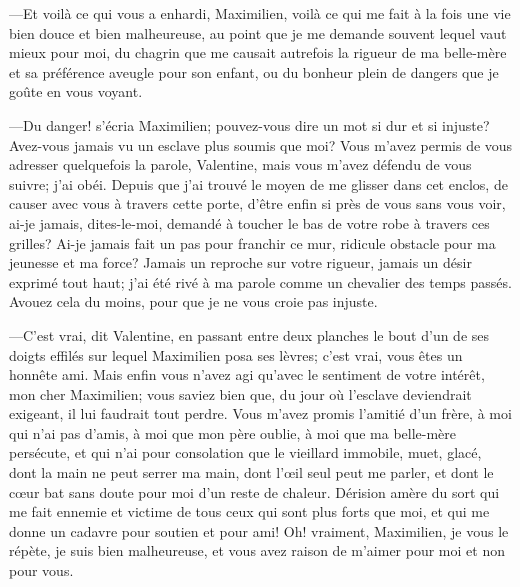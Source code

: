—Et voilà ce qui vous a enhardi, Maximilien, voilà ce qui me fait à la fois une vie bien douce et bien malheureuse, au point que je me demande souvent lequel vaut mieux pour moi, du chagrin que me causait autrefois la rigueur de ma belle-mère et sa préférence aveugle pour son enfant, ou du bonheur plein de dangers que je goûte en vous voyant. 

—Du danger! s'écria Maximilien; pouvez-vous dire un mot si dur et si injuste? Avez-vous jamais vu un esclave plus soumis que moi? Vous m'avez permis de vous adresser quelquefois la parole, Valentine, mais vous m'avez défendu de vous suivre; j'ai obéi. Depuis que j'ai trouvé le moyen de me glisser dans cet enclos, de causer avec vous à travers cette porte, d'être enfin si près de vous sans vous voir, ai-je jamais, dites-le-moi, demandé à toucher le bas de votre robe à travers ces grilles? Ai-je jamais fait un pas pour franchir ce mur, ridicule obstacle pour ma jeunesse et ma force? Jamais un reproche sur votre rigueur, jamais un désir exprimé tout haut; j'ai été rivé à ma parole comme un chevalier des temps passés. Avouez cela du moins, pour que je ne vous croie pas injuste. 

—C'est vrai, dit Valentine, en passant entre deux planches le bout d'un de ses doigts effilés sur lequel Maximilien posa ses lèvres; c'est vrai, vous êtes un honnête ami. Mais enfin vous n'avez agi qu'avec le sentiment de votre intérêt, mon cher Maximilien; vous saviez bien que, du jour où l'esclave deviendrait exigeant, il lui faudrait tout perdre. Vous m'avez promis l'amitié d'un frère, à moi qui n'ai pas d'amis, à moi que mon père oublie, à moi que ma belle-mère persécute, et qui n'ai pour consolation que le vieillard immobile, muet, glacé, dont la main ne peut serrer ma main, dont l'œil seul peut me parler, et dont le cœur bat sans doute pour moi d'un reste de chaleur. Dérision amère du sort qui me fait ennemie et victime de tous ceux qui sont plus forts que moi, et qui me donne un cadavre pour soutien et pour ami! Oh! vraiment, Maximilien, je vous le répète, je suis bien malheureuse, et vous avez raison de m'aimer pour moi et non pour vous. 


